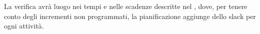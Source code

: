 La verifica avrà luogo nei tempi e nelle scadenze descritte nel \PdP , dove, per tenere conto degli incrementi non programmati, la pianificazione aggiunge dello slack per ogni attività.